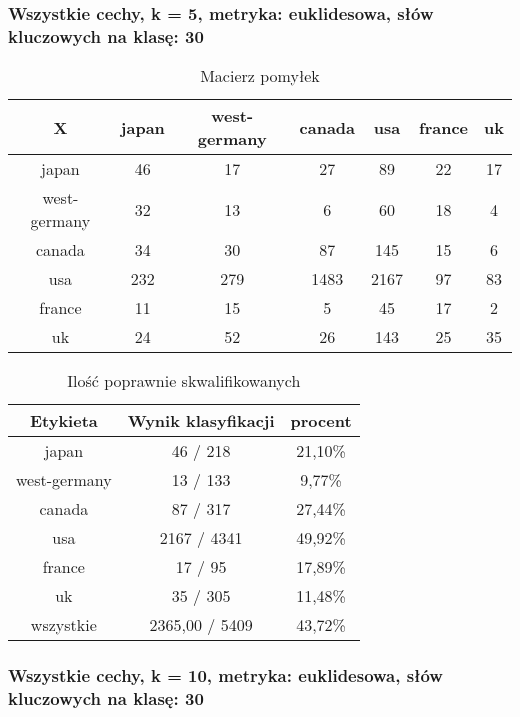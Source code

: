 \documentclass{classrep}
\begin{document}
\newpage
\subsubsection{Wszystkie cechy, k = 5, metryka: euklidesowa, słów kluczowych na klasę: 30}


\begin{table}[h]
\centering
\begin{tabular}{|c|c|c|c|c|c|c|}
\hline
 X  & japan & west-germany & canada & usa & france & uk\\
\hline
japan & 46 & 17 & 27 & 89 & 22 & 17\\
\hline
west-germany & 32 & 13 & 6 & 60 & 18 & 4\\
\hline
canada & 34 & 30 & 87 & 145 & 15 & 6\\
\hline
usa & 232 & 279 & 1483 & 2167 & 97 & 83\\
\hline
france & 11 & 15 & 5 & 45 & 17 & 2\\
\hline
uk & 24 & 52 & 26 & 143 & 25 & 35\\
\hline
\end{tabular}
\caption{Macierz pomyłek}\end{table}

\begin{table}[h]
\centering
\begin{tabular}{|c|c|c|}
\hline
Etykieta & Wynik klasyfikacji & procent\\
\hline
japan & 46 / 218 & 21,10\%\\
\hline
west-germany & 13 / 133 & 9,77\%\\
\hline
canada & 87 / 317 & 27,44\%\\
\hline
usa & 2167 / 4341 & 49,92\%\\
\hline
france & 17 / 95 & 17,89\%\\
\hline
uk & 35 / 305 & 11,48\%\\
\hline
wszystkie & 2365,00 / 5409 & 43,72\%\\
\hline
\end{tabular}
\caption{Ilość poprawnie skwalifikowanych}\end{table}

















\subsubsection{Wszystkie cechy, k = 10, metryka: euklidesowa, słów kluczowych na klasę: 30}
\end{document}
